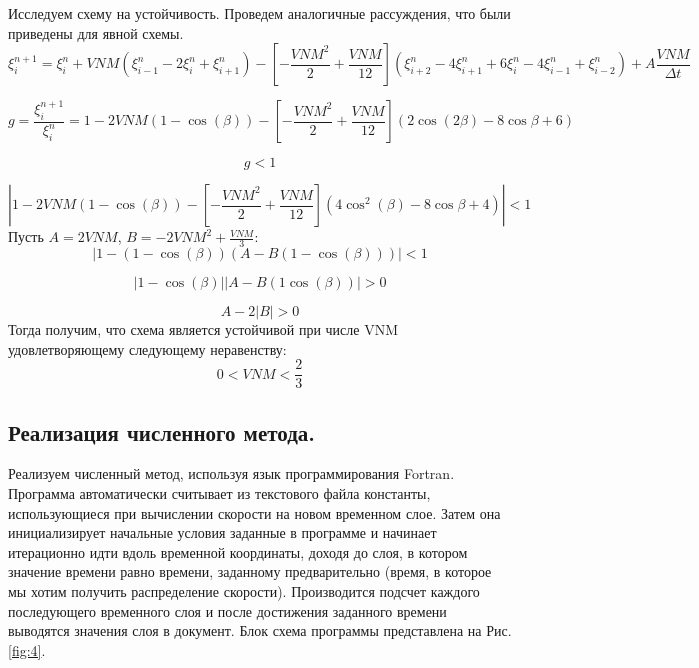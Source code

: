 Исследуем схему на устойчивость. Проведем аналогичные рассуждения, что были приведены для явной схемы.
\begin{equation}
    \xi^{n+1}_i=\xi_i^{n} + VNM (\xi^n_{i-1}-2\xi^n_i+\xi^n_{i+1})-\left[-\frac{VNM^2}{2}+\frac{VNM}{12}\right] (\xi^n_{i+2}-4\xi^n_{i+1}+6\xi_i^n-4\xi^n_{i-1}+\xi^n_{i-2})+A\frac{VNM}{\Delta t} 
\end{equation}

\begin{equation}
    g=\frac{\xi^{n+1}_i}{\xi^n_i}=1-2VNM(1-\cos(\beta))-\left[-\frac{VNM^2}{2}+\frac{VNM}{12}\right] (2\cos(2\beta)-8\cos{\beta}+6)
\end{equation}

\begin{equation}
    g<1
\end{equation}

\begin{equation}
    |1-2VNM(1-\cos(\beta))-\left[-\frac{VNM^2}{2}+\frac{VNM}{12}\right] (4\cos^2(\beta)-8\cos{\beta}+4)|<1
\end{equation}
Пусть $A=2VNM$, $B=-2VNM^2+\frac{VNM}{3}$:
\begin{equation}
    |1-(1-\cos(\beta))(A-B(1-\cos(\beta)))|<1
\end{equation}

\begin{equation}
    |1-\cos(\beta)||A-B(1\cos(\beta))|>0
\end{equation}

\begin{equation}
    A-2|B|>0
\end{equation}
Тогда получим, что схема является устойчивой при числе VNM удовлетворяющему следующему неравенству:
\begin{equation}
    0<VNM<\frac{2}{3}
\end{equation}
 
\subsection{Реализация численного метода.}
Реализуем численный метод, используя язык программирования Fortran. Программа автоматически считывает из текстового файла константы, использующиеся при вычислении скорости на новом временном слое.
Затем она инициализирует начальные условия заданные в программе и начинает итерационно идти вдоль временной координаты, доходя до слоя, в котором значение времени равно времени, заданному предварительно (время, в которое мы хотим получить распределение скорости).
Производится подсчет каждого последующего временного слоя и после достижения заданного времени выводятся значения слоя в документ. Блок схема программы представлена на Рис. \ref{fig:4}.

